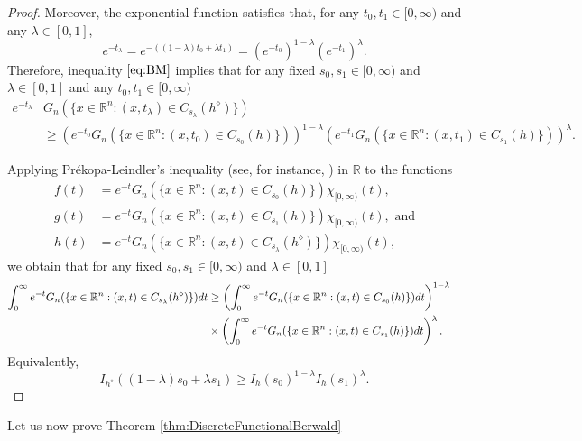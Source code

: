 \documentclass{amsart}
\newcommand{\R}{\mathbb R}
\theoremstyle{remark}
\theoremstyle{definition}
\numberwithin{equation}{section}
\begin{document}
\begin{proof}
Moreover, the exponential function satisfies that, for any $t_0,t_1\in[0,\infty)$ and any $\lambda\in[0,1]$,
\[
e^{-t_{\lambda}} = e^{-((1-\lambda)t_0+ \lambda t_1)} = (e^{-t_0})^{1-\lambda} (e^{-t_1})^{\lambda}.
\]
Therefore, inequality $\eqref{eq:BM}$ implies that for any fixed $s_0,s_1 \in [0, \infty)$ and $\lambda \in [0,1]$ and any $t_0, t_1 \in [0, \infty)$
\begin{align*}
e^{-t_{\lambda}} & G_n(\{ x \in \R^n : (x, t_{\lambda}) \in C_{s_{\lambda}}(h^{\diamond}) \}) \\
& \geq (e^{-t_0} G_n(\{ x \in \R^n : (x,t_0) \in C_{s_0}(h) \} ) )^{1-\lambda} (e^{-t_1} G_n( \{ x \in \R^n : (x,t_1) \in C_{s_1}(h) \} ))^{\lambda}.
\end{align*}

Applying Pr\'ekopa-Leindler's inequality (see, for instance, \cite[Thm. 1.4.1]{AGM}) in $\R$ to the functions
\begin{align*}
f(t) &=e^{-t} G_n(\{ x \in \R^n : (x,t) \in C_{s_0}(h) \} ) \chi_{[0, \infty)}(t), \\
g(t)&= e^{-t} G_n(\{ x \in \R^n : (x,t) \in C_{s_1}(h) \} ) \chi_{[0, \infty)}(t), \textrm{ and} \\
h(t)&=e^{-t} G_n(\{ x \in \R^n : (x, t) \in C_{s_{\lambda}}(h^{\diamond}) \}) \chi_{[0, \infty)}(t),
\end{align*}
we obtain that for any fixed $s_0,s_1 \in [0, \infty)$ and $\lambda \in [0,1]$
\begin{align*}
\int_0^{\infty} e^{-t} G_n(\{ x \in \R^n : (x, t) \in C_{s_{\lambda}}(h^{\diamond}) \}) dt&\geq \left( \int_0^{\infty} e^{-t} G_n(\{ x \in \R^n : (x,t) \in C_{s_0}(h) \} ) dt \right)^{1-\lambda} \cr
&\times\left( \int_0^{\infty} e^{-t} G_n(\{ x \in \R^n : (x,t) \in C_{s_1}(h) \} ) dt \right)^{\lambda}.
\end{align*}
Equivalently,
\[
I_{h^{\diamond}} ((1-\lambda)s_0 + \lambda s_1) \geq I_h(s_0)^{1-\lambda} I_h(s_1)^{\lambda}.
\]
\end{proof}

Let us now prove Theorem \ref{thm:DiscreteFunctionalBerwald}
\end{document}
